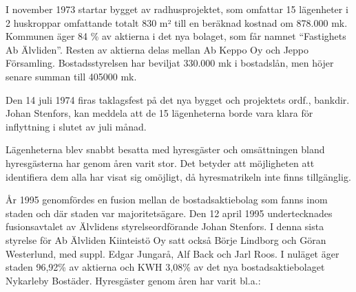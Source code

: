 I november 1973 startar bygget av radhusprojektet, som omfattar 15 lägenheter i 2 huskroppar omfattande totalt 830 m² till en beräknad kostnad om 878.000 mk. Kommunen äger 84 \% av aktierna i det nya bolaget, som får namnet ``Fastighets Ab Älvliden''. Resten av aktierna delas mellan Ab Keppo Oy och Jeppo Församling. Bostadsstyrelsen har beviljat 330.000 mk i bostadslån, men höjer senare summan till 405000 mk.

Den 14 juli 1974 firas taklagsfest på det nya bygget och projektets ordf., bankdir. Johan Stenfors, kan meddela att de 15 lägenheterna borde vara klara för inflyttning i slutet av juli månad.

Lägenheterna blev snabbt besatta med hyresgäster och omsättningen bland hyresgästerna har genom åren varit stor. Det betyder att möjligheten att identifiera dem alla har visat sig omöjligt, då hyresmatrikeln inte finns tillgänglig.

År 1995 genomfördes en fusion mellan de bostadsaktiebolag som fanns inom staden och där staden var majoritetsägare. Den 12 april 1995 undertecknades fusionsavtalet av Älvlidens styrelseordförande Johan Stenfors. I denna sista styrelse för Ab Älvliden Kiinteistö Oy satt också Börje Lindborg och Göran Westerlund, med suppl. Edgar Jungarå, Alf Back och Jarl Roos. I nuläget äger staden 96,92\% av aktierna och KWH 3,08\% av det nya bostadsaktiebolaget Nykarleby Bostäder.
Hyresgäster genom åren har varit bl.a.:

